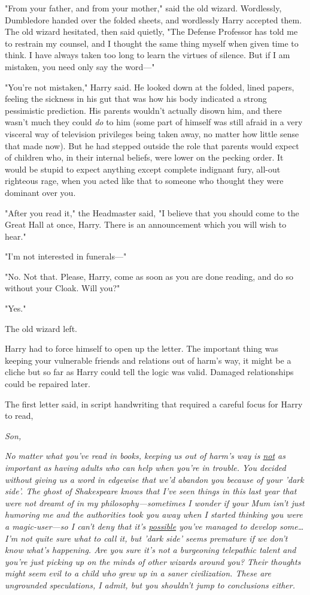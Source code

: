 "From your father, and from your mother," said the old wizard. Wordlessly, 
Dumbledore handed over the folded sheets, and wordlessly Harry accepted them. 
The old wizard hesitated, then said quietly, "The Defense Professor has told me 
to restrain my counsel, and I thought the same thing myself when given time to 
think. I have always taken too long to learn the virtues of silence. But if I 
am mistaken, you need only say the word---"

"You're not mistaken," Harry said. He looked down at the folded, lined papers, 
feeling the sickness in his gut that was how his body indicated a strong 
pessimistic prediction. His parents wouldn't actually disown him, and there 
wasn't much they could \emph{do} to him (some part of himself was still afraid 
in a very visceral way of television privileges being taken away, no matter how 
little sense that made now). But he had stepped outside the role that parents 
would expect of children who, in their internal beliefs, were lower on the 
pecking order. It would be stupid to expect anything except complete indignant 
fury, all-out righteous rage, when you acted like that to someone who thought 
they were dominant over you.

"After you read it," the Headmaster said, "I believe that you should come to 
the Great Hall at once, Harry. There is an announcement which you will wish to 
hear."

"I'm not interested in funerals---"

"No. Not that. Please, Harry, come as soon as you are done reading, and do so 
without your Cloak. Will you?"

"Yes."

The old wizard left.

Harry had to force himself to open up the letter. The important thing was 
keeping your vulnerable friends and relations out of harm's way, it might be a 
cliche but so far as Harry could tell the logic was valid. Damaged 
relationships could be repaired later.

The first letter said, in script handwriting that required a careful focus for 
Harry to read,

\emph{Son,}

\emph{No matter what you've read in books, keeping us out of harm's way is 
\underline{not} as important as having adults who can help when you're in 
trouble. You decided without giving us a word in edgewise that we'd abandon you 
because of your 'dark side'. The ghost of Shakespeare knows that I've seen 
things in this last year that were not dreamt of in my philosophy---sometimes I 
wonder if your Mum isn't just humoring me and the authorities took you away 
when I started thinking you were a magic-user---so I can't deny that it's 
\underline{possible} you've managed to develop some{\ldots} I'm not quite sure 
what to call it, but 'dark side' seems premature if we don't know what's 
happening. Are you sure it's not a burgeoning telepathic talent and you're just 
picking up on the minds of other wizards around you? Their thoughts might seem 
evil to a child who grew up in a saner civilization. These are ungrounded 
speculations, I admit, but you shouldn't jump to conclusions either.}

